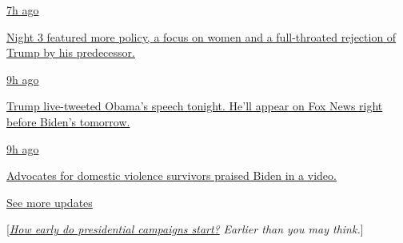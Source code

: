 \href{https://www.nytimes3xbfgragh.onion/live/2020/08/19/us/dnc-convention-election?action=click\&pgtype=Article\&state=default\&region=MAIN_CONTENT_1\&context=storylines_live_updates\#night-3-featured-more-policy-a-focus-on-women-and-a-full-throated-rejection-of-trump-by-his-predecessor}{7h
ago}

\href{https://www.nytimes3xbfgragh.onion/live/2020/08/19/us/dnc-convention-election?action=click\&pgtype=Article\&state=default\&region=MAIN_CONTENT_1\&context=storylines_live_updates\#night-3-featured-more-policy-a-focus-on-women-and-a-full-throated-rejection-of-trump-by-his-predecessor}{Night
3 featured more policy, a focus on women and a full-throated rejection
of Trump by his predecessor.}

\href{https://www.nytimes3xbfgragh.onion/live/2020/08/19/us/dnc-convention-election?action=click\&pgtype=Article\&state=default\&region=MAIN_CONTENT_1\&context=storylines_live_updates\#trump-live-tweeted-obamas-speech-tonight-hell-appear-on-fox-news-right-before-bidens-tomorrow}{9h
ago}

\href{https://www.nytimes3xbfgragh.onion/live/2020/08/19/us/dnc-convention-election?action=click\&pgtype=Article\&state=default\&region=MAIN_CONTENT_1\&context=storylines_live_updates\#trump-live-tweeted-obamas-speech-tonight-hell-appear-on-fox-news-right-before-bidens-tomorrow}{Trump
live-tweeted Obama's speech tonight. He'll appear on Fox News right
before Biden's tomorrow.}

\href{https://www.nytimes3xbfgragh.onion/live/2020/08/19/us/dnc-convention-election?action=click\&pgtype=Article\&state=default\&region=MAIN_CONTENT_1\&context=storylines_live_updates\#advocates-for-domestic-violence-survivors-praised-biden-in-a-video}{9h
ago}

\href{https://www.nytimes3xbfgragh.onion/live/2020/08/19/us/dnc-convention-election?action=click\&pgtype=Article\&state=default\&region=MAIN_CONTENT_1\&context=storylines_live_updates\#advocates-for-domestic-violence-survivors-praised-biden-in-a-video}{Advocates
for domestic violence survivors praised Biden in a video.}

\href{https://www.nytimes3xbfgragh.onion/live/2020/08/19/us/dnc-convention-election?action=click\&pgtype=Article\&state=default\&region=MAIN_CONTENT_1\&context=storylines_live_updates}{See
more updates}

{[}\href{https://www.nytimes3xbfgragh.onion/2018/12/31/us/politics/presidential-campaigns-2020.html?action=click\&module=Intentional\&pgtype=Article}{\emph{How
early do presidential campaigns start?}} \emph{Earlier than you may
think.}{]}

